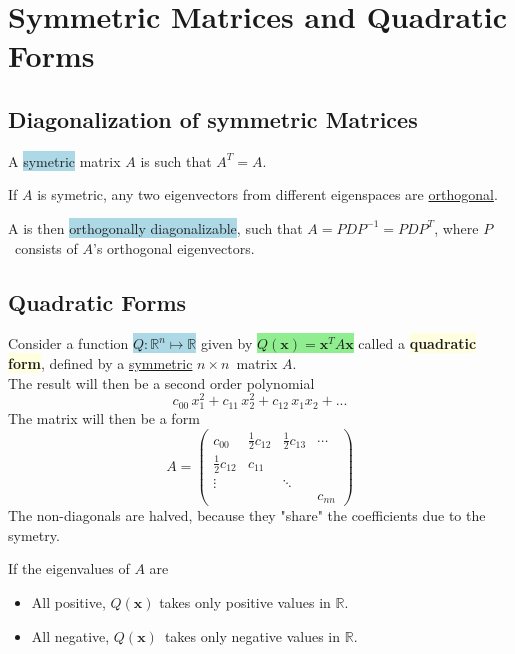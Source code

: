 \documentclass[12p,a4paper]{report}
\renewcommand{\b}{\boldsymbol}
\newcommand{\m}{\mathbb}
\newcommand{\half}{\frac{1}{2}}
\newcommand{\yll}{\colorbox{lightyellow}}
\newcommand{\grr}{\colorbox{lightgreen}}
\newcommand{\bll}{\colorbox{lightblue}}
\begin{document}
\chapter{Symmetric Matrices and Quadratic Forms}

\section{Diagonalization of symmetric Matrices}
A \bll{symetric} matrix $A$ is such that $A^T = A$.

If $A$ is symetric, any two eigenvectors from different eigenspaces are \underline{orthogonal}.

A is then \bll{orthogonally diagonalizable}, such that $A = PDP^{-1} = PDP^T$, where $P$ consists of $A$'s orthogonal eigenvectors.

\section{Quadratic Forms}
Consider a function \bll{$Q: \m R^n \mapsto \m R$} given by \grr{$Q(\b x) = \b x^T A \b x$} called a \yll{\textbf{quadratic form}}, defined by a \underline{symmetric} $n\times n$ matrix $A$.\\
The result will then be a second order polynomial
\[
    c_{00}\, x_1^2 + c_{11}\, x_2^2 + c_{12}\, x_1 x_2 + ...
\]
The matrix will then be a form
\[
    A = \begin{pmatrix}
        c_{00} & \half c_{12} & \half c_{13} & \cdots \\
        \half c_{12} & c_{11} & & \\
        \vdots & & \ddots & \\
        & & & c_{nn}
    \end{pmatrix}
\]
The non-diagonals are halved, because they "share" the coefficients due to the symetry.

\begin{tcolorbox}
    If the eigenvalues of $A$ are 
    \begin{itemize}
        \item All positive, $Q(\b x)$ takes only positive values in $\m R$.
        \item All negative, $Q(\b x)$ takes only negative values in $\m R$.
    \end{itemize}
\end{tcolorbox}
\end{document}
